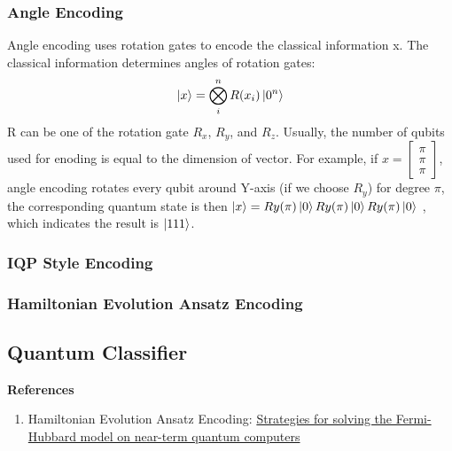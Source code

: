 \documentclass{article}
\begin{document}
\subsubsection*{Angle Encoding}
Angle encoding uses rotation gates to encode the classical information x. 
The classical information determines angles of rotation gates:
\begin{equation}
  \ket{x} = \bigotimes_i^n R(x_i) \ket{0^n}
\end{equation}
R can be one of the rotation gate $R_x$, $R_y$, and $R_z$. Usually, the 
number of qubits used for enoding is equal to the dimension of vector. For example, 
if $x = \begin{bmatrix}
  \pi \\ \pi \\ \pi 
\end{bmatrix}$, angle encoding rotates every qubit around Y-axis (if we choose $R_y$)
for degree $\pi$, the corresponding quantum state is then $\ket{x} = Ry(\pi) \ket{0} Ry(\pi) \ket{0} Ry(\pi) \ket{0}$
, which indicates the result is $\ket{111}$.

\subsubsection*{IQP Style Encoding}

\subsubsection*{Hamiltonian Evolution Ansatz Encoding}


\subsection*{Quantum Classifier}

\textbf{References}
\begin{enumerate}
  \item Hamiltonian Evolution Ansatz Encoding: \href{https://journals.aps.org/prb/abstract/10.1103/PhysRevB.102.235122}{Strategies for solving the Fermi-Hubbard model on near-term quantum computers}
\end{enumerate}
\end{document}
